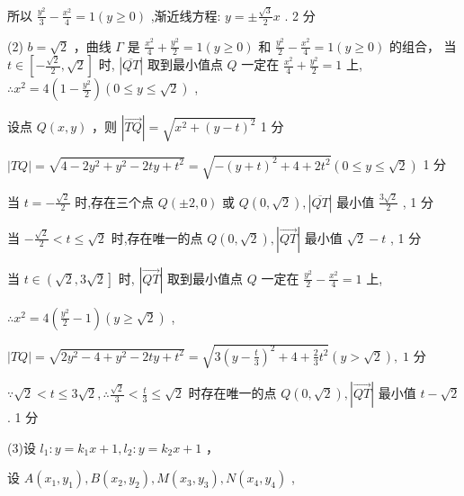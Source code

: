 \documentclass[10pt]{article}
\begin{document}
所以 \(\frac{{y}^{2}}{3} - \frac{{x}^{2}}{4} = 1\left( {y \geq  0}\right)\) ,渐近线方程: \(y =  \pm  \frac{\sqrt{3}}{2}x\) . 2 分

(2) \(b = \sqrt{2}\) ，曲线 \(\Gamma\) 是 \(\frac{{x}^{2}}{4} + \frac{{y}^{2}}{2} = 1\left( {y \geq  0}\right)\) 和 \(\frac{{y}^{2}}{2} - \frac{{x}^{2}}{4} = 1\left( {y \geq  0}\right)\) 的组合， 当 \(t \in  \left\lbrack  {-\frac{\sqrt{2}}{2},\sqrt{2}}\right\rbrack\) 时, \(\left| \overline{QT}\right|\) 取到最小值点 \(Q\) 一定在 \(\frac{{x}^{2}}{4} + \frac{{y}^{2}}{2} = 1\) 上, \(\therefore {x}^{2} = 4\left( {1 - \frac{{y}^{2}}{2}}\right) \left( {0 \leq  y \leq  \sqrt{2}}\right)\) ,

设点 \(Q\left( {x,y}\right)\) ，则 \(\left| \overrightarrow{TQ}\right|  = \sqrt{{x}^{2} + {\left( y - t\right) }^{2}}\) 1 分

\(\left| {TQ}\right|  = \sqrt{4 - 2{y}^{2} + {y}^{2} - {2ty} + {t}^{2}} = \sqrt{-{\left( y + t\right) }^{2} + 4 + 2{t}^{2}}\left( {0 \leq  y \leq  \sqrt{2}}\right)\) 1 分

当 \(t =  - \frac{\sqrt{2}}{2}\) 时,存在三个点 \(Q\left( {\pm 2,0}\right)\) 或 \(Q\left( {0,\sqrt{2}}\right) ,\left| \overline{QT}\right|\) 最小值 \(\frac{3\sqrt{2}}{2}\) , 1 分

当 \(- \frac{\sqrt{2}}{2} < t \leq  \sqrt{2}\) 时,存在唯一的点 \(Q\left( {0,\sqrt{2}}\right) ,\left| \overrightarrow{QT}\right|\) 最小值 \(\sqrt{2} - t\) , 1 分

当 \(t \in  \left( {\sqrt{2},3\sqrt{2}}\right\rbrack\) 时, \(\left| \overrightarrow{QT}\right|\) 取到最小值点 \(Q\) 一定在 \(\frac{{y}^{2}}{2} - \frac{{x}^{2}}{4} = 1\) 上,

\(\therefore {x}^{2} = 4\left( {\frac{{y}^{2}}{2} - 1}\right) \left( {y \geq  \sqrt{2}}\right)\) ,

\(\left| {TQ}\right|  = \sqrt{2{y}^{2} - 4 + {y}^{2} - {2ty} + {t}^{2}} = \sqrt{3{\left( y - \frac{t}{3}\right) }^{2} + 4 + \frac{2}{3}{t}^{2}}\left( {y > \sqrt{2}}\right) ,\;1\) 分

\(\because \sqrt{2} < t \leq  3\sqrt{2},\therefore \frac{\sqrt{2}}{3} < \frac{t}{3} \leq  \sqrt{2}\) 时存在唯一的点 \(Q\left( {0,\sqrt{2}}\right) ,\left| \overrightarrow{QT}\right|\) 最小值 \(t - \sqrt{2}\) . 1 分

(3)设 \({l}_{1} : y = {k}_{1}x + 1,{l}_{2} : y = {k}_{2}x + 1\) ，

设 \(A\left( {{x}_{1},{y}_{1}}\right) ,B\left( {{x}_{2},{y}_{2}}\right) ,M\left( {{x}_{3},{y}_{3}}\right) ,N\left( {{x}_{4},{y}_{4}}\right)\) ,
\end{document}
